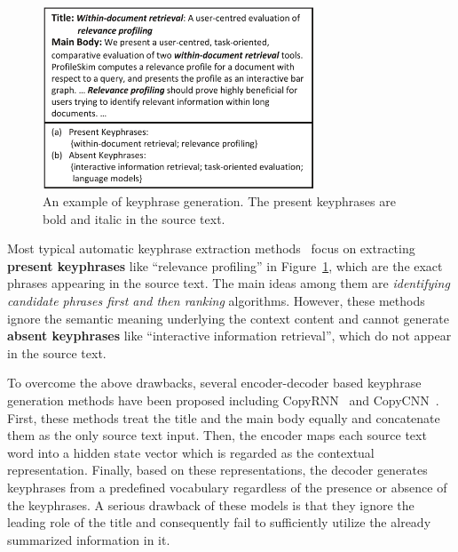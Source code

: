 \documentclass[letterpaper]{article} %
\begin{document}
\begin{figure}
\centering
\includegraphics[width=3.2in]{figures/PaperID3210_TGNet_intro_case_study_cmyk.pdf}
\caption{An example of keyphrase generation. The present keyphrases are bold and italic in the source text.}
\label{figure: keyphrase generation example}
\end{figure}

Most typical automatic keyphrase extraction methods~\cite{witten1999kea,medelyan2009human,mihalcea2004textrank} focus on extracting \textbf{present keyphrases} like ``relevance profiling'' in Figure~\ref{figure: keyphrase generation example}, which are the exact phrases appearing in the source text. The main ideas among them are \textit{identifying candidate phrases first and then ranking} algorithms. However, these methods ignore the semantic meaning underlying the context content and cannot generate \textbf{absent keyphrases} like ``interactive information retrieval'', which do not appear in the source text. 


To overcome the above drawbacks, several encoder-decoder based keyphrase generation methods have been proposed including CopyRNN~\cite{meng2017dkg} and CopyCNN~\cite{zhang2017dkg_conv}. First, these methods treat the title and the main body equally and concatenate them as the only source text input. Then, the encoder maps each source text word into a hidden state vector which is regarded as the contextual representation. Finally, based on these representations, the decoder generates keyphrases from a predefined vocabulary regardless of the presence or absence of the keyphrases. 
A serious drawback of these models is that they ignore the leading role of the title and consequently fail to sufficiently utilize the already summarized information in it.
\end{document}
